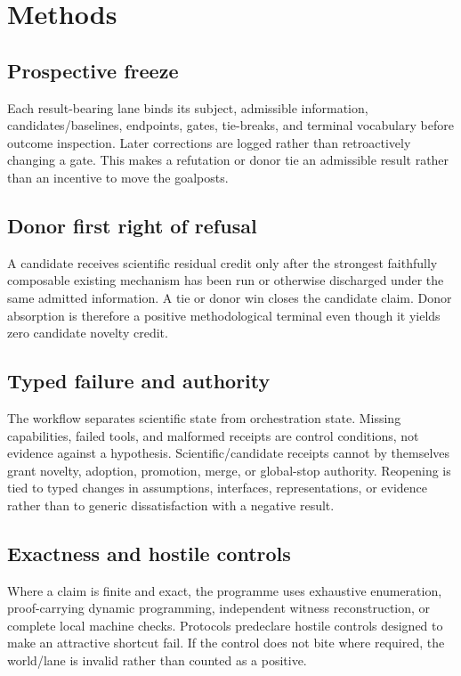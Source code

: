 \section{Methods}

\subsection{Prospective freeze}
Each result-bearing lane binds its subject, admissible information, candidates/baselines, endpoints, gates, tie-breaks, and terminal vocabulary before outcome inspection. Later corrections are logged rather than retroactively changing a gate. This makes a refutation or donor tie an admissible result rather than an incentive to move the goalposts.

\subsection{Donor first right of refusal}
A candidate receives scientific residual credit only after the strongest faithfully composable existing mechanism has been run or otherwise discharged under the same admitted information. A tie or donor win closes the candidate claim. Donor absorption is therefore a positive methodological terminal even though it yields zero candidate novelty credit.

\subsection{Typed failure and authority}
The workflow separates scientific state from orchestration state. Missing capabilities, failed tools, and malformed receipts are control conditions, not evidence against a hypothesis. Scientific/candidate receipts cannot by themselves grant novelty, adoption, promotion, merge, or global-stop authority. Reopening is tied to typed changes in assumptions, interfaces, representations, or evidence rather than to generic dissatisfaction with a negative result.

\subsection{Exactness and hostile controls}
Where a claim is finite and exact, the programme uses exhaustive enumeration, proof-carrying dynamic programming, independent witness reconstruction, or complete local machine checks. Protocols predeclare hostile controls designed to make an attractive shortcut fail. If the control does not bite where required, the world/lane is invalid rather than counted as a positive.

